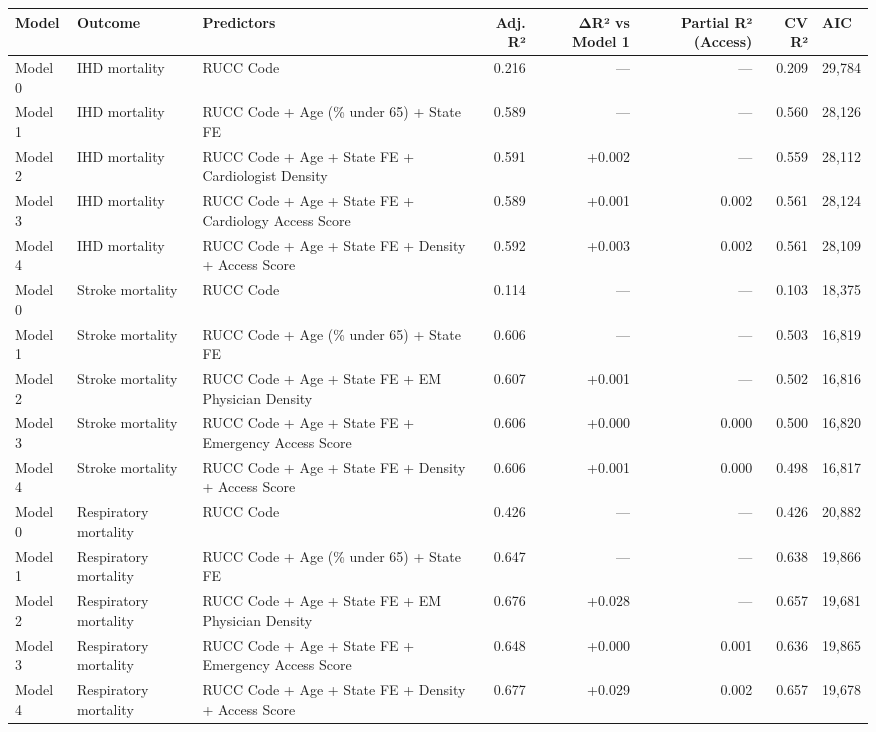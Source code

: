\begin{table}[ht]
\centering
\small
\begin{tabular}{llp{5cm}rrrrl}
\toprule
Model & Outcome & Predictors & Adj. R² & ΔR² vs Model 1 & Partial R² (Access) & CV R² & AIC \\
\midrule
Model 0 & IHD mortality & RUCC Code & 0.216 & — & — & 0.209 & 29,784 \\
Model 1 & IHD mortality & RUCC Code + Age (\% under 65) + State FE & 0.589 & — & — & 0.560 & 28,126 \\
Model 2 & IHD mortality & RUCC Code + Age + State FE + Cardiologist Density & 0.591 & +0.002 & — & 0.559 & 28,112 \\
Model 3 & IHD mortality & RUCC Code + Age + State FE + Cardiology Access Score & 0.589 & +0.001 & 0.002 & 0.561 & 28,124 \\
Model 4 & IHD mortality & RUCC Code + Age + State FE + Density + Access Score & 0.592 & +0.003 & 0.002 & 0.561 & 28,109 \\
Model 0 & Stroke mortality & RUCC Code & 0.114 & — & — & 0.103 & 18,375 \\
Model 1 & Stroke mortality & RUCC Code + Age (\% under 65) + State FE & 0.606 & — & — & 0.503 & 16,819 \\
Model 2 & Stroke mortality & RUCC Code + Age + State FE + EM Physician Density & 0.607 & +0.001 & — & 0.502 & 16,816 \\
Model 3 & Stroke mortality & RUCC Code + Age + State FE + Emergency Access Score & 0.606 & +0.000 & 0.000 & 0.500 & 16,820 \\
Model 4 & Stroke mortality & RUCC Code + Age + State FE + Density + Access Score & 0.606 & +0.001 & 0.000 & 0.498 & 16,817 \\
Model 0 & Respiratory mortality & RUCC Code & 0.426 & — & — & 0.426 & 20,882 \\
Model 1 & Respiratory mortality & RUCC Code + Age (\% under 65) + State FE & 0.647 & — & — & 0.638 & 19,866 \\
Model 2 & Respiratory mortality & RUCC Code + Age + State FE + EM Physician Density & 0.676 & +0.028 & — & 0.657 & 19,681 \\
Model 3 & Respiratory mortality & RUCC Code + Age + State FE + Emergency Access Score & 0.648 & +0.000 & 0.001 & 0.636 & 19,865 \\
Model 4 & Respiratory mortality & RUCC Code + Age + State FE + Density + Access Score & 0.677 & +0.029 & 0.002 & 0.657 & 19,678 \\
\bottomrule
\end{tabular}
\end{table}
